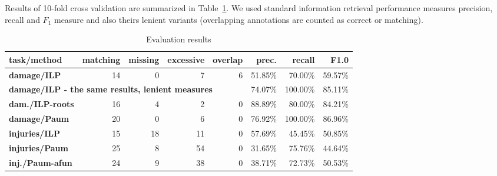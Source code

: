 \documentclass[runningheads,a4paper]{llncs}
\begin{document}


Results of 10-fold cross validation are summarized in Table~\ref{tab:EvaluationResults}. We used standard information retrieval performance measures precision, recall and $F_1$ measure and also theirs lenient variants (overlapping annotations are counted as correct or matching).

\begin{table}[t]
	\centering
			
\begin{tabular}{|l||r|r|r|r|r|r|r|}
\hline
\textbf{task/method} & \textbf{matching} & \textbf{missing} & \textbf{excessive} & \textbf{overlap} & \textbf{prec.} & \textbf{recall} & \textbf{F1.0}\\
\hline
\hline
\textbf{damage/ILP} & 14 & 0 & 7 & 6 & 51.85\% & 70.00\% & 59.57\%\\
\hline
\multicolumn{5}{|l|}{\textbf{damage/ILP - the same results, lenient measures}} & 74.07\% & 100.00\% & 85.11\%\\
\hline
\textbf{dam./ILP-roots} & 16 & 4 & 2 & 0 & 88.89\% & 80.00\% & 84.21\%\\
\hline
\textbf{damage/Paum} & 20 & 0 & 6 & 0 & 76.92\% & 100.00\% & 86.96\%\\
\hline
\hline
\textbf{injuries/ILP} & 15 & 18 & 11 & 0 & 57.69\% & 45.45\% & 50.85\%\\
\hline
\textbf{injuries/Paum} & 25 & 8 & 54 & 0 & 31.65\% & 75.76\% & 44.64\%\\
\hline
\textbf{inj./Paum-afun} & 24 & 9 & 38 & 0 & 38.71\% & 72.73\% & 50.53\%\\
\hline
\end{tabular}
						
	\caption{Evaluation results }
	\label{tab:EvaluationResults}
\end{table}
\end{document}
